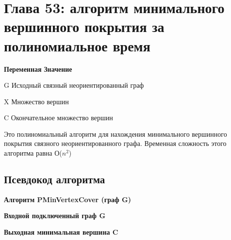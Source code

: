 
\chapter*{Глава 53: алгоритм минимального вершинного покрытия за полиномиальное время}
\vspace{-0.4cm}

\textbf{Переменная}	\hspace*{15mm} \textbf{Значение}

\vspace{\baselineskip}
\vspace{-0.4cm}
G      \hspace*{10mm}     Исходный связный неориентированный граф

\vspace{\baselineskip}
\vspace{-0.4cm}
X	   \hspace*{10mm}     Множество вершин

\vspace{\baselineskip}
\vspace{-0.4cm}
C	   \hspace*{10mm}     Окончательное множество вершин

\vspace{\baselineskip}
Это полиномиальный алгоритм для нахождения минимального вершинного покрытия связного неориентированного графа. Временная сложность этого алгоритма равна О($n^2$)

\section*{Псевдокод алгоритма}
\vspace{-0.2cm}

\vspace{\baselineskip}
\vspace{-0.4cm}
\textbf{Алгоритм PMinVertexCover (граф G)}

\vspace{\baselineskip}
\vspace{-0.4cm}
\textbf{Входной подключенный граф G}

\vspace{\baselineskip}
\vspace{-0.4cm}
\textbf{Выходная минимальная вершина C}

